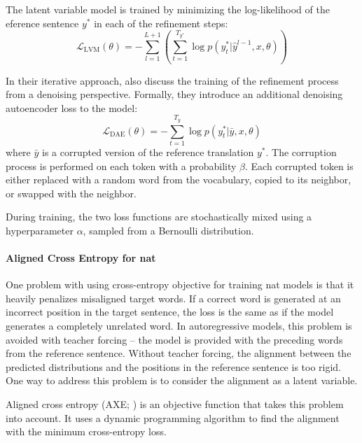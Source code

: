 The latent variable model is trained by minimizing the log-likelihood of the
eference sentence $y^*$ in each of the refinement steps:
\begin{equation}
  \mathcal{L}_{\text{LVM}}(\theta) = - \sum_{l=1}^{L+1} \left(
    \sum_{t=1}^{T_{y^*}} \log p(y_t^* | \hat{y}^{l-1}, x, \theta)
  \right) \label{eq:refinement-lvm-loss}
\end{equation}

In their iterative approach, \citet{lee-etal-2018-deterministic} also discuss
the training of the refinement process from a denoising perspective. Formally,
they introduce an additional denoising autoencoder loss to the model:
%
\begin{equation}
  \mathcal{L}_{\text{DAE}}(\theta) = - \sum_{t=1}^{T_y} \log p(y_t^* | \bar{y}, x, \theta)
\end{equation}
where $\bar{y}$ is a corrupted version of the reference translation $y^*$. The
corruption process is performed on each token with a probability $\beta$. Each
corrupted token is either replaced with a random word from the vocabulary,
copied to its neighbor, or swapped with the neighbor.

During training, the two loss functions are stochastically mixed using a
hyperparameter $\alpha$, sampled from a Bernoulli distribution.


\paragraph{Aligned Cross Entropy for \ac{nat}} One problem with using
cross-entropy objective for training \ac{nat} models is that it heavily
penalizes misaligned target words. If a correct word is generated at an
incorrect position in the target sentence, the loss is the same as if the model
generates a completely unrelated word. In autoregressive models, this problem
is avoided with teacher forcing -- the model is provided with the preceding
words from the reference sentence. Without teacher forcing, the alignment
between the predicted distributions and the positions in the reference sentence
is too rigid. One way to address this problem is to consider the alignment as a
latent variable. 

Aligned cross entropy (AXE; \citealp{ghazvininejad2020aligned}) is an objective
function that takes this problem into account. It uses a dynamic programming
algorithm to find the alignment with the minimum cross-entropy loss. 

